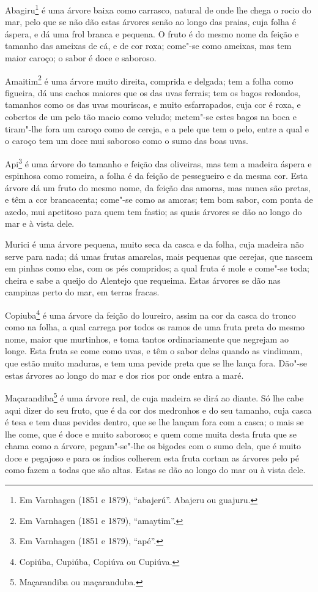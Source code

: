 Abagiru\footnote{ Em Varnhagen (1851 e 1879), ``abajerú''. Abajeru ou guajuru.} é uma
árvore baixa como carrasco, natural de onde lhe chega o rocio do mar, pelo que se não dão
estas árvores senão ao longo das praias, cuja folha é áspera, e dá uma frol branca e
pequena. O fruto é do mesmo nome da feição e tamanho das ameixas de cá, e de cor roxa;
come"-se como ameixas, mas tem maior caroço; o sabor é doce e saboroso.

Amaitim\footnote{ Em Varnhagen (1851 e 1879), ``amaytim''.} é uma árvore muito direita,
comprida e delgada; tem a folha como figueira, dá uns cachos maiores que os das uvas
ferrais; tem os bagos redondos, tamanhos como os das uvas mouriscas, e muito esfarrapados,
cuja cor é roxa, e cobertos de um pelo tão macio como veludo; metem"-se estes bagos na boca
e tiram"-lhe fora um caroço como de cereja, e a pele que tem o pelo, entre a qual e o
caroço tem um doce mui saboroso como o sumo das boas uvas.

Api\footnote{ Em Varnhagen (1851 e 1879), ``apé''.} é uma árvore do tamanho e feição das
oliveiras, mas tem a madeira áspera e espinhosa como romeira, a folha é da feição de
pessegueiro e da mesma cor. Esta árvore dá um fruto do mesmo nome, da feição das amoras,
mas nunca são pretas, e têm a cor brancacenta; come"-se como as amoras; tem bom sabor, com
ponta de azedo, mui apetitoso para quem tem fastio; as quais árvores se dão ao longo do
mar e à vista dele.

Murici é uma árvore pequena, muito seca da casca e da folha, cuja madeira não serve para
nada; dá umas frutas amarelas, mais pequenas que cerejas, que nascem em pinhas como elas,
com os pés compridos; a qual fruta é mole e come"-se toda; cheira e sabe a queijo do
Alentejo que requeima. Estas árvores se dão nas campinas perto do mar, em terras fracas.

Copiuba\footnote{ Copiúba, Cupiúba, Copiúva ou Cupiúva.} é uma árvore da feição do
loureiro, assim na cor da casca do tronco como na folha, a qual carrega por todos os ramos
de uma fruta preta do mesmo nome, maior que murtinhos, e toma tantos ordinariamente que
negrejam ao longe. Esta fruta se come como uvas, e têm o sabor delas quando as vindimam,
que estão muito maduras, e tem uma pevide preta que se lhe lança fora. Dão"-se estas
árvores ao longo do mar e dos rios por onde entra a maré.

Maçarandiba\footnote{ Maçarandiba ou maçaranduba.} é uma árvore real, de cuja madeira se
dirá ao diante. Só lhe cabe aqui dizer do seu fruto, que é da cor dos medronhos e do seu
tamanho, cuja casca é tesa e tem duas pevides dentro, que se lhe lançam fora com a casca;
o mais se lhe come, que é doce e muito saboroso; e quem come muita desta fruta que se
chama como a árvore, pegam"-se"-lhe os bigodes com o sumo dela, que é muito doce e pegajoso
e para os índios colherem esta fruta cortam as árvores pelo pé como fazem a todas que são
altas. Estas se dão ao longo do mar ou à vista dele.


